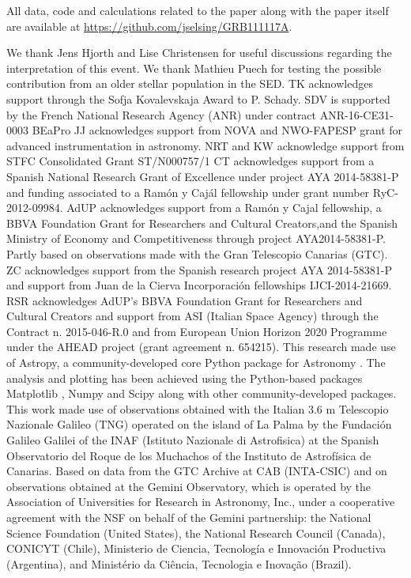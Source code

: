\documentclass{aa}    %
\begin{document}
All data, code and calculations related to the paper along with the
paper itself are available at \url{https://github.com/jselsing/GRB111117A}.

\begin{acknowledgements}
We thank Jens Hjorth and Lise Christensen for useful discussions regarding the interpretation of this event. We thank Mathieu Puech for testing the possible contribution from an older stellar population in the SED.
%	
TK acknowledges support through the Sofja Kovalevskaja Award to P. Schady.
%
SDV is supported by the French National Research Agency (ANR) under contract ANR-16-CE31-0003 BEaPro 
%
JJ acknowledges support from NOVA and NWO-FAPESP grant for advanced
instrumentation in astronomy.
%
NRT and KW acknowledge support from STFC Consolidated
Grant ST/N000757/1
%
CT acknowledges support from a Spanish National Research Grant of Excellence
under project AYA 2014-58381-P and funding associated to a Ramón y Cajál
fellowship under grant number RyC-2012-09984.
%
AdUP acknowledges support from a Ramón y Cajal fellowship, a BBVA Foundation
Grant for Researchers and Cultural Creators,and the Spanish Ministry of Economy
and Competitiveness through project AYA2014-58381-P. Partly based on
observations made with the Gran Telescopio Canarias (GTC).
%
ZC acknowledges support from the Spanish research project AYA 2014-58381-P and
support from Juan de la Cierva Incorporaci\'on fellowships IJCI-2014-21669.
%
RSR acknowledges AdUP's BBVA Foundation Grant for Researchers and Cultural
Creators and support from ASI (Italian Space Agency) through the Contract n. 2015-046-R.0 and from European Union Horizon 2020 Programme under the AHEAD project (grant agreement n. 654215).
%
This research made use of Astropy, a community-developed core Python package for Astronomy \citep{TheAstropyCollaboration2013}. The analysis and plotting has been achieved using the Python-based packages Matplotlib \citep{Hunter2007}, Numpy and Scipy \citep{VanderWalt2011} along with other community-developed packages.
%
This work made use of observations obtained with the Italian 3.6 m Telescopio Nazionale Galileo (TNG) operated on the island of La Palma by the Fundaci\'on Galileo Galilei of the INAF (Istituto Nazionale di Astrofisica) at the Spanish Observatorio del Roque de los Muchachos of the Instituto de Astrof\'isica de Canarias.
%
Based on data from the GTC Archive at CAB (INTA-CSIC) and on observations obtained at the Gemini Observatory, which is operated by the Association of Universities for Research in Astronomy, Inc., under a cooperative agreement with the NSF on behalf of the Gemini partnership: the National Science Foundation (United States), the National Research Council (Canada), CONICYT (Chile), Ministerio de Ciencia, Tecnología e Innovación Productiva (Argentina), and Ministério da Ciência, Tecnologia e Inovação (Brazil).

\end{acknowledgements}



\end{document}
